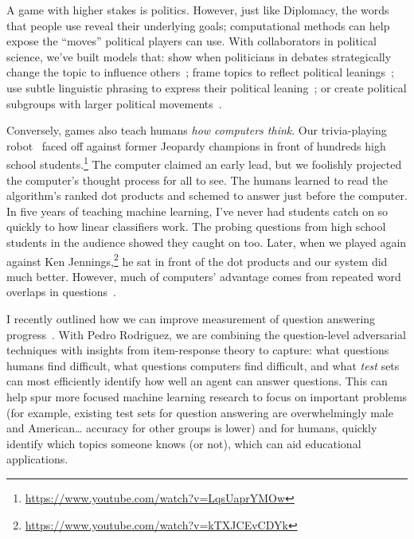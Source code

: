 A game with higher stakes is politics. However, just like Diplomacy, the words
that people use reveal their underlying goals; computational methods can help
expose the ``moves'' political players can use. With collaborators in political
science, we've built models that: show when politicians in debates
strategically change the topic to influence others~\cite{nguyen-12,Nguyen-14b};
frame topics to reflect political leanings~\cite{nguyen-13:shlda}; use subtle
linguistic phrasing to express their political leaning~\cite{iyyer-14a}; or
create political subgroups with larger political
movements~\cite{Nguyen:Boyd-Graber:Resnik:Miler-2015}.

Conversely, games also teach humans \emph{how computers think}.  Our
trivia-playing robot~\cite{boyd-graber-12,iyyer-14b,iyyer-15} faced off against
former Jeopardy champions in front of hundreds high school
students.\footnote{\url{https://www.youtube.com/watch?v=LqsUaprYMOw}} The
computer claimed an early lead, but we foolishly projected the computer's
thought process for all to see.  The humans learned to read the algorithm's
ranked dot products and schemed to answer just before the computer. In five
years of teaching machine learning, I've never had students catch on so quickly
to how linear classifiers work.  The probing questions from high school students
in the audience showed they caught on too.  Later, when we played again against
Ken Jennings,\footnote{\url{https://www.youtube.com/watch?v=kTXJCEvCDYk}} he sat
in front of the dot products and our system did much better.  However,
much of computers' advantage comes from repeated word overlaps in
questions~\cite{wallace-19}.

I recently outlined how we can improve measurement of question
answering progress~\cite{boyd-graber-20}.  With Pedro Rodriguez, we
are combining the question-level adversarial techniques with insights
from item-response theory to capture: what questions humans find
difficult, what questions computers find difficult, and what
\emph{test} sets can most efficiently identify how well an agent can
answer questions.  This can help spur more focused machine learning
research to focus on important problems (for example, existing test
sets for question answering are overwhelmingly male and American\dots
accuracy for other groups is lower) and for humans, quickly identify
which topics someone knows (or not), which can aid educational
applications.

